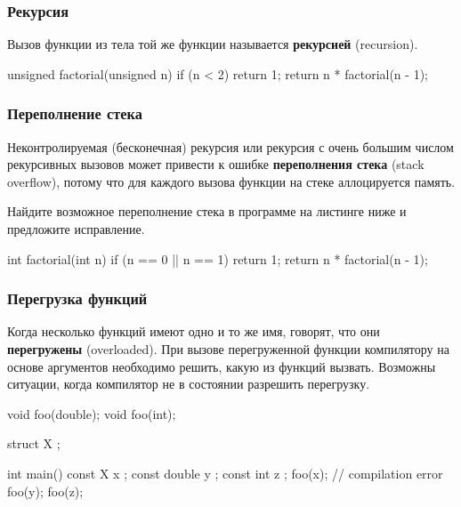 \documentclass[compress, 8pt, aspectratio=169]{beamer}
\begin{document}
\begin{frame}[fragile]

    \frametitle{Рекурсия}

    Вызов функции из тела той же функции называется \textbf{рекурсией} (recursion).

    \begin{myinplacelisting}[minted language=cpp]
unsigned factorial(unsigned n) {
    if (n < 2) {
        return 1;
    }
    return n * factorial(n - 1);
}
    \end{myinplacelisting}

\end{frame}

\begin{frame}[fragile]

    \frametitle{Переполнение стека}

    Неконтролируемая (бесконечная) рекурсия или рекурсия с очень большим числом рекурсивных
    вызовов может привести к ошибке \textbf{переполнения стека}\footnotemark{}
    (stack overflow), потому что для каждого вызова функции на стеке аллоцируется память.


    \begin{task}
        Найдите возможное переполнение стека в программе на листинге ниже и предложите
        исправление.
    \end{task}

    \begin{myinplacelisting}[%
        minted language=cpp,
        minted options={
            fontsize=\normalsize,
            breaklines,
            breakanywhere,
            linenos,
            escapeinside=??,
            numbersep=2pt
        },
    ]
int factorial(int n) {
    if (n == 0 || n == 1) {
        return 1;
    }
    return n * factorial(n - 1);
}
    \end{myinplacelisting}

\end{frame}

\begin{frame}[fragile]

    \frametitle{Перегрузка функций}

    Когда несколько функций имеют одно и то же имя, говорят, что они
    \textbf{перегружены}\footnotemark{} (overloaded).
    При вызове перегруженной функции компилятору на основе аргументов
    необходимо решить, какую из функций вызвать.
    Возможны ситуации, когда компилятор не в состоянии разрешить перегрузку.


    \begin{myinplacelisting}[minted language=cpp]
void foo(double);
void foo(int);

struct X {};

int main() {
    const X x {};
    const double y {};
    const int z {};
    foo(x); // compilation error
    foo(y);
    foo(z);
}
    \end{myinplacelisting}

\end{frame}
\end{document}
